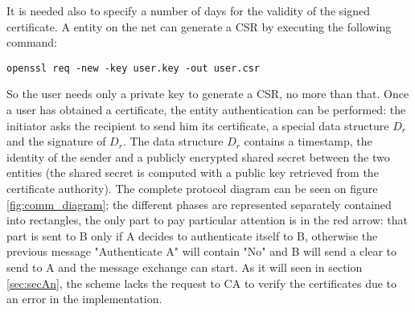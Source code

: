 \documentclass{article}
\begin{document}
It is needed also to specify a number of days for the validity of the signed certificate.\newline
A entity on the net can generate a CSR by executing the following command:

\begin{lstlisting}[breaklines]
openssl req -new -key user.key -out user.csr
\end{lstlisting}

So the user needs only a private key to generate a CSR, no more than that. Once a user has obtained a certificate, the entity authentication can be performed: the initiator asks the recipient to send him its certificate, a special data structure \textit{$D_r$} and the signature of \textit{$D_r$}. The data structure \textit{$D_r$} contains a timestamp, the identity of the sender and a publicly encrypted shared secret between the two entities (the shared secret is computed with a public key retrieved from the certificate authority).\newline
The complete protocol diagram can be seen on figure \ref{fig:comm_diagram}; the different phases are represented separately contained into rectangles, the only part to pay particular attention is in the red arrow: that part is sent to B only if A decides to authenticate itself to B, otherwise the previous message "Authenticate A" will contain "No" and B will send a clear to send to A and the message exchange can start. As it will seen in section \ref{sec:secAn}, the scheme lacks the request to CA to verify the certificates due to an error in the implementation.
\end{document}
